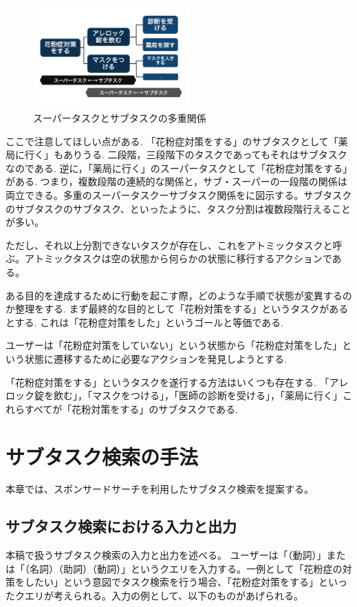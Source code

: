 \documentclass[submit,techreq]{ipsj}
\begin{document}
\begin{figure}[tb]
\includegraphics[width=6cm, bb=0 0 350 319]{super_sub_sub.jpg}
\caption{スーパータスクとサブタスクの多重関係}
\label{fig:super_sub_sub}
\end{figure}


ここで注意してほしい点がある. 「花粉症対策をする」のサブタスクとして「薬局に行く」もありうる. 二段階，三段階下のタスクであってもそれはサブタスクなのである. 逆に，「薬局に行く」のスーパータスクとして「花粉症対策をする」がある. つまり，複数段階の連続的な関係と，サブ・スーパーの一段階の関係は両立できる。多重のスーパータスクーサブタスク関係をに図示する。サブタスクのサブタスクのサブタスク、といったように、タスク分割は複数段階行えることが多い。

ただし、それ以上分割できないタスクが存在し、これをアトミックタスクと呼ぶ。アトミックタスクは空の状態から何らかの状態に移行するアクションである。


ある目的を達成するために行動を起こす際，どのような手順で状態が変異するのか整理をする. まず最終的な目的として「花粉対策をする」というタスクがあるとする. これは「花粉症対策をした」というゴールと等価である.

ユーザーは「花粉症対策をしていない」という状態から「花粉症対策をした」という状態に遷移するために必要なアクションを発見しようとする.

「花粉症対策をする」というタスクを遂行する方法はいくつも存在する. 「アレロック錠を飲む」，「マスクをつける」，「医師の診断を受ける」，「薬局に行く」これらすべてが「花粉対策をする」のサブタスクである.



\section{サブタスク検索の手法}
本章では、スポンサードサーチを利用したサブタスク検索を提案する。

\subsection{サブタスク検索における入力と出力}
本稿で扱うサブタスク検索の入力と出力を述べる。
ユーザーは「（動詞）」または「（名詞）（助詞）（動詞）」というクエリを入力する。一例として「花粉症の対策をしたい」という意図でタスク検索を行う場合、「花粉症対策をする」といったクエリが考えられる。入力の例として、以下のものがあげられる。
\end{document}
